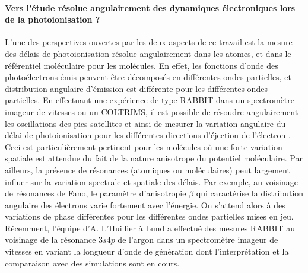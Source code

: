 \paragraph*{Vers l'étude résolue angulairement des dynamiques électroniques lors de la photoionisation ?} L'une des perspectives ouvertes par les deux aspects de ce travail est la mesure des délais de photoionisation résolue angulairement dans les atomes, et dans le référentiel moléculaire pour les molécules. En effet, les fonctions d'onde des photoélectrons émis peuvent être décomposés en différentes ondes partielles, et distribution angulaire d'émission est différente pour les différentes ondes partielles. En effectuant une expérience de type RABBIT dans un spectromètre imageur de vitesses ou un COLTRIMS, il est possible de résoudre angulairement les oscillations des pics satellites et ainsi de mesurer la variation angulaire du délai de photoionisation pour les différentes directions d'éjection de l'électron . Ceci est particulièrement pertinent pour les molécules où une forte variation spatiale est attendue du fait de la nature anisotrope du potentiel moléculaire. Par ailleurs, la présence de résonances (atomiques ou moléculaires) peut largement influer sur la variation spectrale et spatiale des délais. Par exemple, au voisinage de résonances de Fano, le paramètre d'anisotropie $\beta$ qui caractérise la distribution angulaire des électrons varie fortement avec l'énergie. On s'attend alors à des variations de phase différentes pour les différentes ondes partielles mises en jeu. Récemment, l'équipe d'A. L'Huillier à Lund a effectué des mesures RABBIT au voisinage de la résonance $3s4p$ de l'argon dans un spectromètre imageur de vitesses en variant la longueur d'onde de génération  dont l'interprétation et la comparaison avec des simulations sont en cours. 

